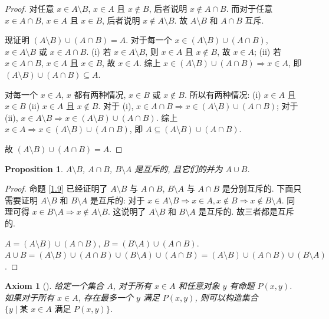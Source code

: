 \documentclass[UTF8]{ctexart}
\theoremstyle{mystyle}
\newtheorem{axiom}{Axiom}[section]
\newtheorem{proposition}{Proposition}[section]
\theoremstyle{myremark}
\theoremstyle{plain}
\begin{document}
\begin{proof}
    对任意 $ x \in A \setminus B $, $ x \in A $ 且 $ x \notin B $, 后者说明 $ x \notin A \cap B $. 而对于任意 $ x \in A \cap B $, $ x \in A $ 且 $ x \in B $, 后者说明 $ x \notin A \setminus B $. 故 $ A \setminus B $ 和 $ A \cap B $ 互斥.

    现证明 $ (A \setminus B) \cup (A \cap B) = A $. 对于每一个 $ x \in (A \setminus B) \cup (A \cap B) $, $ x \in A \setminus B $ 或 $ x \in A \cap B $. (i) 若 $ x \in A \setminus B $, 则 $ x \in A $ 且 $ x \notin B $, 故 $ x \in A $; (ii) 若 $ x \in A \cap B $, $ x \in A $ 且 $ x \in B $, 故 $ x \in A $. 综上 $ x \in (A \setminus B) \cup (A \cap B) \Longrightarrow x \in A $, 即 $ (A \setminus B) \cup (A \cap B) \subseteq A $.

    对每一个 $ x \in A $, $ x $ 都有两种情况, $ x \in B $ 或 $ x \notin B $. 所以有两种情况: (i) $ x \in A $ 且 $ x \in B $ (ii) $ x \in A $ 且 $ x \notin B $. 对于 (i), $ x \in A \cap B \Longrightarrow x \in (A \setminus B) \cup (A \cap B) $; 对于 (ii), $ x \in A \setminus B \Longrightarrow x \in (A \setminus B) \cup (A \cap B) $. 综上 $ x \in A \Longrightarrow x \in (A \setminus B) \cup (A \cap B) $, 即 $ A \subseteq (A \setminus B) \cup (A \cap B) $.

    故 $ (A \setminus B) \cup (A \cap B) = A $.
\end{proof}

\begin{proposition} \label{1.10}
    $ A \setminus B $, $ A \cap B $, $ B \setminus A $ 是互斥的, 且它们的并为 $ A \cup B $.
\end{proposition}

\begin{proof}
    命题 \ref{1.9} 已经证明了 $ A \setminus B $ 与 $ A \cap B $, $ B \setminus A $ 与 $ A \cap B $ 是分别互斥的. 下面只需要证明 $ A \setminus B $ 和 $ B \setminus A $ 是互斥的: 对于 $ x \in A \setminus B \Longrightarrow x \in A, x \notin B \Longrightarrow x \notin B \setminus A $. 同理可得 $ x \in B \setminus A \Longrightarrow x \notin A \setminus B $. 这说明了 $ A \setminus B $ 和 $ B \setminus A $ 是互斥的. 故三者都是互斥的.

    $ A = (A \setminus B) \cup (A \cap B) $, $ B = (B \setminus A) \cup (A \cap B) $. $ A \cup B = (A \setminus B) \cup (A \cap B) \cup (B \setminus A) \cup (A \cap B) = (A \setminus B) \cup (A \cap B) \cup (B \setminus A) $.
\end{proof}


\begin{axiom}[]
    给定一个集合 $ A $, 对于所有 $ x \in A $ 和任意对象 $ y $ 有命题 $ P(x, y) $. 如果对于所有 $ x \in A $, 存在最多一个 $ y $ 满足 $ P(x, y) $, 则可以构造集合 $ \{ y \mid \text{某 } x \in A \text{ 满足 } P(x, y) \} $.
\end{axiom}
\end{document}
